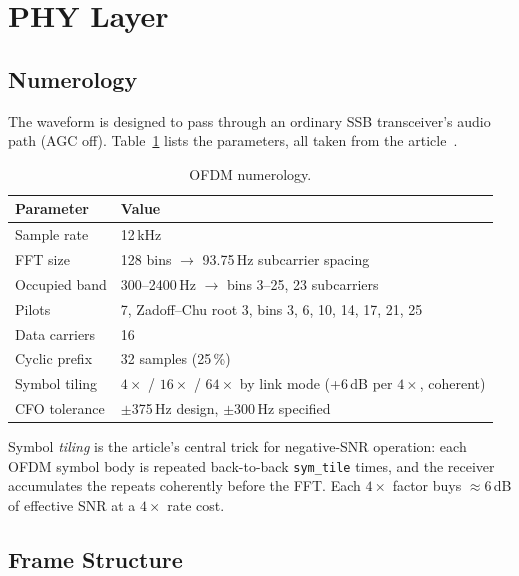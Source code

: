 \section{PHY Layer}
\label{sec:phy}

\subsection{Numerology}

The waveform is designed to pass through an ordinary SSB transceiver's
audio path (AGC off).  Table~\ref{tab:numerology} lists the parameters,
all taken from the article~\cite{habr_ofdm}.

\begin{table}[H]
    \centering
    \caption{OFDM numerology.}
    \label{tab:numerology}
    \small
    \begin{tabular}{@{}lp{8.5cm}@{}}
    \toprule
    \textbf{Parameter} & \textbf{Value} \\
    \midrule
    Sample rate       & 12\,kHz \\
    FFT size          & 128 bins $\rightarrow$ 93.75\,Hz subcarrier spacing \\
    Occupied band     & 300--2400\,Hz $\rightarrow$ bins 3--25, 23 subcarriers \\
    Pilots            & 7, Zadoff--Chu root 3, bins 3, 6, 10, 14, 17, 21, 25 \\
    Data carriers     & 16 \\
    Cyclic prefix     & 32 samples (25\,\%) \\
    Symbol tiling     & $4\times$ / $16\times$ / $64\times$ by link mode
                        (+6\,dB per $4\times$, coherent) \\
    CFO tolerance     & $\pm$375\,Hz design, $\pm$300\,Hz specified \\
    \bottomrule
    \end{tabular}
\end{table}

Symbol \emph{tiling} is the article's central trick for negative-SNR
operation: each OFDM symbol body is repeated back-to-back
\texttt{sym\_tile} times, and the receiver accumulates the repeats
coherently before the FFT.  Each $4\times$ factor buys $\approx$6\,dB
of effective SNR at a $4\times$ rate cost.

\subsection{Frame Structure}


